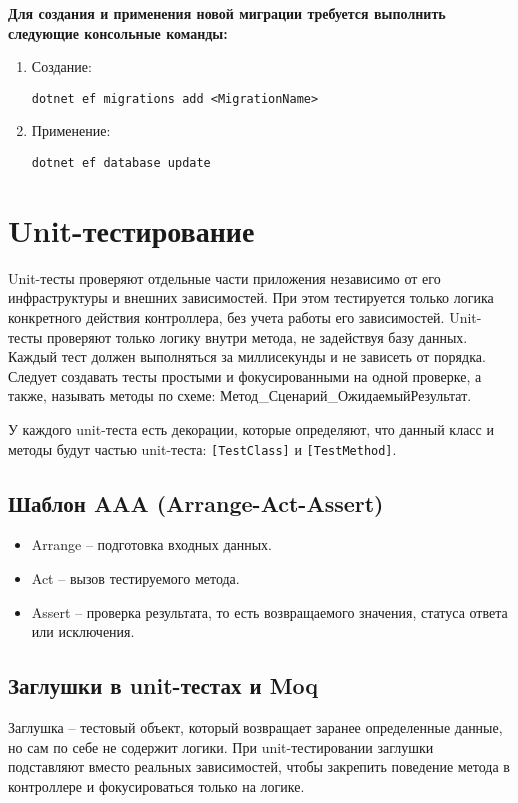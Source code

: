 \documentclass[a4paper,12pt]{report}
\begin{document}
\textbf{Для создания и применения новой миграции требуется выполнить следующие консольные команды:}
\begin{enumerate}
    \item
        Создание:

        \texttt{dotnet ef migrations add <MigrationName>}
    \item
        Применение:

        \texttt{dotnet ef database update}
\end{enumerate}

\section{Unit-тестирование}

Unit-тесты проверяют отдельные части приложения независимо от его инфраструктуры и внешних зависимостей. 
При этом тестируется только логика конкретного действия контроллера, без учета работы его зависимостей.
Unit-тесты проверяют только логику внутри метода, не задействуя базу данных. Каждый тест должен выполняться 
за миллисекунды и не зависеть от порядка. Следует создавать тесты простыми и фокусированными на одной проверке, 
а также, называть методы по схеме: Метод\_Сценарий\_ОжидаемыйРезультат.

У каждого unit-теста есть декорации, которые определяют, что данный класс и методы будут частью unit-теста: 
\texttt{[TestClass]} и \texttt{[TestMethod]}.

\subsection{Шаблон AAA (Arrange-Act-Assert)}
\begin{itemize}
    \item
        Arrange -- подготовка входных данных.
    \item
        Act -- вызов тестируемого метода.
    \item
        Assert -- проверка результата, то есть возвращаемого значения, статуса ответа или исключения.
\end{itemize}

\subsection{Заглушки в unit-тестах и Moq}
Заглушка -- тестовый объект, который возвращает заранее определенные данные, 
но сам по себе не содержит логики. При unit-тестировании заглушки подставляют вместо реальных зависимостей, 
чтобы закрепить поведение метода в контроллере и фокусироваться только на логике.
\end{document}
